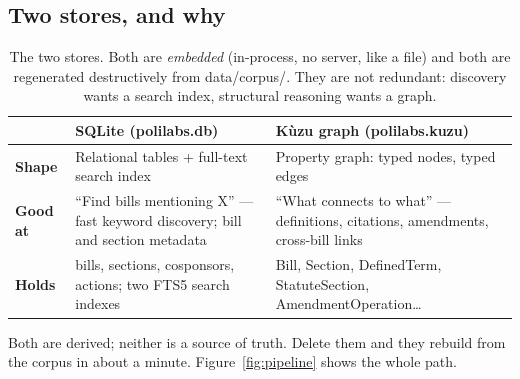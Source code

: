 \documentclass[11pt]{article}
\newcommand{\code}[1]{{\ttfamily\small #1}}
\begin{document}
\subsection{Two stores, and why}

\begin{table}[ht]
\centering\small
\begin{tabular}{@{}lp{5.1cm}p{5.6cm}@{}}
\toprule
 & \textbf{SQLite} (\code{polilabs.db}) & \textbf{K\`uzu graph} (\code{polilabs.kuzu})\\
\midrule
\textbf{Shape}    & Relational tables + full-text search index & Property graph: typed nodes, typed edges\\
\textbf{Good at}  & ``Find bills mentioning X'' --- fast keyword discovery; bill and section metadata & ``What connects to what'' --- definitions, citations, amendments, cross-bill links\\
\textbf{Holds}    & \code{bills}, \code{sections}, \code{cosponsors}, \code{actions}; two FTS5 search indexes & \code{Bill}, \code{Section}, \code{DefinedTerm}, \code{StatuteSection}, \code{AmendmentOperation}\ldots\\
\bottomrule
\end{tabular}
\caption{The two stores. Both are \emph{embedded} (in-process, no server, like a
file) and both are regenerated destructively from \code{data/corpus/}. They are
not redundant: discovery wants a search index, structural reasoning wants a
graph.}
\end{table}

Both are derived; neither is a source of truth. Delete them and they rebuild
from the corpus in about a minute. Figure~\ref{fig:pipeline} shows the whole
path.
\end{document}
